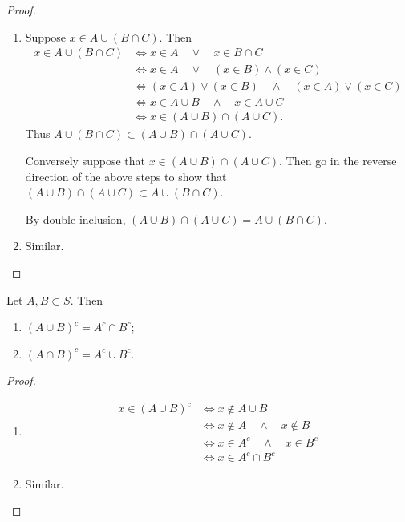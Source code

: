 \begin{proof} \
\begin{enumerate}[label=(\roman*)]
\item Suppose $x\in A\cup(B \cap C)$. Then
\begin{align*}
x\in A\cup(B \cap C)
&\iff x\in A\quad\lor\quad x\in B\cap C\\
&\iff x\in A\quad\lor\quad (x\in B)\land (x\in C)\\
&\iff (x\in A)\lor (x\in B)\quad\land\quad (x\in A)\lor (x\in C)\\
&\iff x\in A\cup B\quad\land\quad x\in A\cup C\\
&\iff x\in (A\cup B)\cap(A\cup C).
\end{align*}
Thus $A \cup (B \cap C) \subset (A \cup B) \cap (A \cup C)$.

Conversely suppose that $x \in (A \cup B) \cap (A \cup C)$. Then go in the reverse direction of the above steps to show that $(A\cup B)\cap (A\cup C)\subset A\cup(B\cap C)$.

By double inclusion, $(A\cup B)\cap(A\cup C)=A\cup(B\cap C)$.

\item Similar.
\end{enumerate}
\end{proof}

\begin{proposition}
Let $A,B\subset S$. Then
\begin{enumerate}[label=(\roman*)]
\item $(A \cup B)^c = A^c \cap B^c$;
\item $(A \cap B)^c = A^c \cup B^c$.
\end{enumerate}
\end{proposition}

\begin{proof} \
\begin{enumerate}[label=(\roman*)]
\item \begin{align*}
x\in(A\cup B)^c&\iff x\notin A\cup B\\
&\iff x\notin A\quad\land\quad x\notin B\\
&\iff x\in A^c\quad\land\quad x\in B^c\\
&\iff x\in A^c\cap B^c
\end{align*}

\item Similar.
\end{enumerate}
\end{proof}

